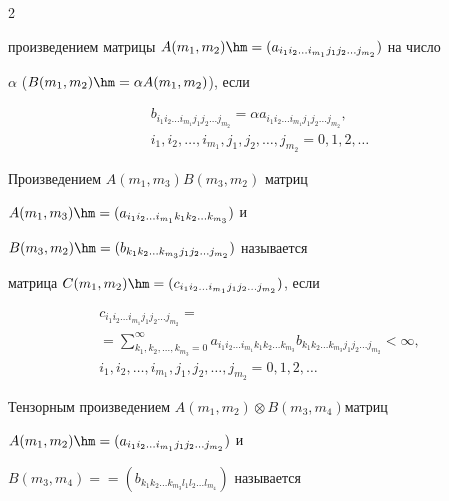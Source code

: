 \begin{multicols}{2}
{произведением матрицы $A(m_1,m_2) \hm=


(a_{i_1 i_2 \dots i_{m_1} j_1 j_2 \dots j_{m_2}})$ на чис\-ло 


$\alpha$ ($B(m_1,m_2) \hm= \alpha A(m_1,m_2)$), если


\begin{multline*}


  b_{i_1 i_2 \dots i_{m_1} j_1 j_2 \dots j_{m_2}} = 


  \alpha a_{i_1 i_2 \dots i_{m_1} j_1 j_2 \dots j_{m_2}}, \\


i_1,i_2,\dots,i_{m_1},j_1,j_2,\dots,j_{m_2} = 0,1,2,\dots


\end{multline*}





Произведением $A(m_1,m_3) B(m_3,m_2)$ мат\-риц 


$A(m_1,m_3) \hm= (a_{i_1 i_2 \dots i_{m_1} k_1 k_2 \dots k_{m_3}})$ и 


$B(m_3,m_2) \hm= (b_{k_1 k_2 \dots k_{m_3} j_1 j_2 \dots j_{m_2}})$ называется 


мат\-ри\-ца $C(m_1,m_2) \hm= (c_{i_1 i_2 \dots i_{m_1} j_1 j_2 \dots j_{m_2}})$, если


\begin{multline*}


  c_{i_1 i_2 \dots i_{m_1} j_1 j_2 \dots j_{m_2}} ={}\\


  {}=\! \!\!\!\sum\limits_{k_1,k_2,\dots,k_{m_3} = 0}^\infty\!\!\! \!


  a_{i_1 i_2 \dots i_{m_1} k_1 k_2 \dots k_{m_3}}  b_{k_1 k_2 


  \dots k_{m_3} j_1 j_2 \dots j_{m_2}} < \infty, \\


  i_1,i_2,\dots,i_{m_1},j_1,j_2,\dots,j_{m_2} = 0,1,2,\dots


\end{multline*}





Тензорным произведением $A(m_1,m_2) \otimes B(m_3,m_4)$\linebreak матриц 


$A(m_1,m_2) \hm= (a_{i_1 i_2 \dots i_{m_1} j_1 j_2 \dots j_{m_2}})$ и 


$B(m_3,m_4) =$\linebreak $= (b_{k_1 k_2 \dots k_{m_3} l_1 l_2 \dots l_{m_4}})$ называется 


}
\end{multicols}
